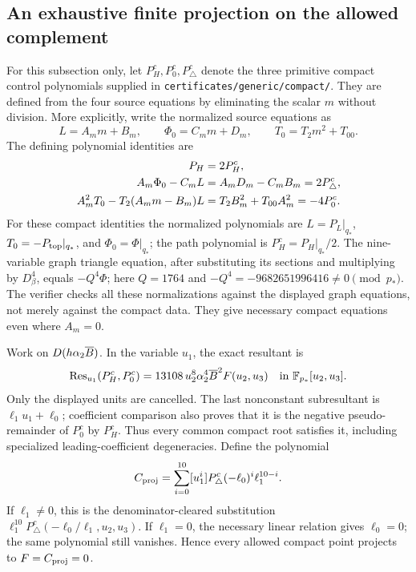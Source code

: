 \documentclass[11pt,a4paper]{article}
\theoremstyle{remark}\newtheorem{remark}[theorem]{Remark}
\begin{document}
\subsection{An exhaustive finite projection on the allowed complement}
\label{generic:projection}
For this subsection only, let $P_H^c,P_0^c,P_\triangle^c$ denote the
three primitive compact control polynomials supplied in
\texttt{certificates/generic/compact/}. They are defined from the four
source equations by eliminating the scalar $m$ without division. More
explicitly, write the normalized source equations as
\[
 L=A_m m+B_m,\qquad \Phi_0=C_m m+D_m,
 \qquad T_0=T_2m^2+T_{00}.
\]
The defining polynomial identities are
\begin{align}
 P_H&=2P_H^c,\notag\\
 A_m\Phi_0-C_mL&=A_mD_m-C_mB_m=2P_\triangle^c,
 \label{generic:compacttriangle}\\
 A_m^2T_0-T_2(A_mm-B_m)L
   &=T_2B_m^2+T_{00}A_m^2=-4P_0^c.\label{generic:compacttop}
\end{align}
For these compact identities the normalized polynomials are
$L=P_L|_{q_*}$, $T_0=-P_{\rm top}|_{q_*}$, and $\Phi_0=\Phi|_{q_*}$;
the path polynomial is $P_H^c=P_H|_{q_*}/2$. The nine-variable graph
triangle equation, after substituting its sections and multiplying by
$D_\beta^4$, equals $-Q^4\Phi$; here $Q=1764$ and
$-Q^4=-9682651996416\ne0\pmod{p_*}$. The verifier checks all these
normalizations against the displayed graph equations, not merely against
the compact data.
They give necessary compact equations even where $A_m=0$.

Work on $D(h\alpha_2\overline B)$. In the variable $u_1$, the exact resultant is
\begin{equation}\label{generic:firstresultant}
 \operatorname{Res}_{u_1}(P_H^c,P_0^c)
 =13108\,u_2^8\alpha_2^4\overline B^2 F(u_2,u_3)
 \quad\text{in }\mathbb F_{p_*}[u_2,u_3].
\end{equation}
Only the displayed units are cancelled. The last nonconstant
subresultant is $\ell_1u_1+\ell_0$; coefficient comparison also proves
that it is the negative pseudo-remainder of $P_0^c$ by $P_H^c$.
Thus every common compact root satisfies it, including specialized
leading-coefficient degeneracies. Define the polynomial
\[
 C_{\rm proj}=\sum_{i=0}^{10}[u_1^i]P_\triangle^c
                       (-\ell_0)^i\ell_1^{10-i}.
\]
If $\ell_1\ne0$, this is the denominator-cleared substitution
$\ell_1^{10}P_\triangle^c(-\ell_0/\ell_1,u_2,u_3)$.
If $\ell_1=0$, the necessary linear relation gives $\ell_0=0$;
the same polynomial still vanishes. Hence every allowed compact point
projects to $F=C_{\rm proj}=0$.
\end{document}
